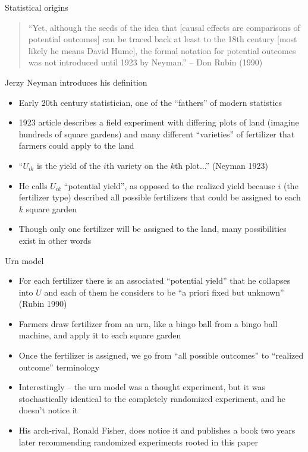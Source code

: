 \documentclass{beamer}
\begin{document}
\begin{frame}{Statistical origins}

\begin{quote}
``Yet, although the seeds of the idea that [causal effects are comparisons of potential outcomes] can be traced back at least to the 18th century [most likely he means David Hume], the formal notation for potential outcomes was not introduced until 1923 by Neyman.'' -- Don Rubin (1990)
\end{quote}

\end{frame}


\begin{frame}{Jerzy Neyman introduces his definition}

\begin{itemize}
\item Early 20th century statistician, one of the ``fathers'' of modern statistics
\item 1923 article describes a field experiment with differing plots of land (imagine hundreds of square gardens) and many different ``varieties'' of fertilizer that farmers could apply to the land
\item ``$U_{ik}$ is the yield of the $i$th variety on the $k$th plot...'' (Neyman 1923)
\item He calls $U_{ik}$ ``potential yield'', as opposed to the realized yield because $i$ (the fertilizer type) described all possible fertilizers that could be assigned to each $k$ square garden
\item Though only one fertilizer will be assigned to the land, many possibilities exist in other words
\end{itemize}

\end{frame}

\begin{frame}{Urn model}

\begin{itemize}

\item For each fertilizer there is an associated ``potential yield'' that he collapses into $U$ and each of them he considers to be ``a priori fixed but unknown'' (Rubin 1990)
\item Farmers draw fertilizer from an urn, like a bingo ball from a bingo ball machine, and apply it to each square garden
\item Once the fertilizer is assigned, we go from ``all possible outcomes'' to ``realized outcome'' terminology
\item Interestingly -- the urn model was a thought experiment, but it was stochastically identical to the completely randomized experiment, and he doesn't notice it
\item His arch-rival, Ronald Fisher, does notice it and publishes a book two years later recommending randomized experiments rooted in this paper
\end{itemize}

\end{frame}
\end{document}
